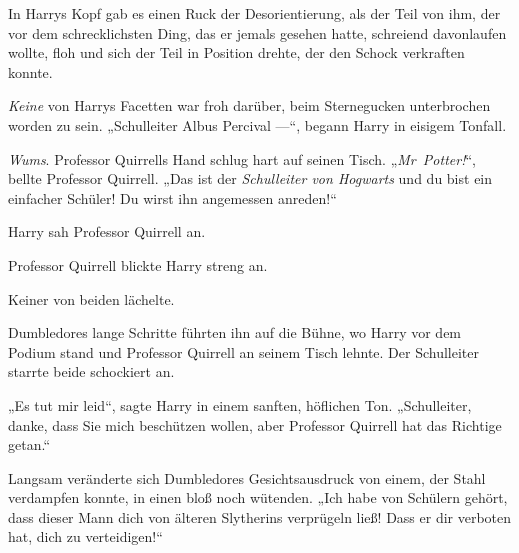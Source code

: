 In Harrys Kopf gab es einen Ruck der Desorientierung, als der Teil von ihm, der vor dem schrecklichsten Ding, das er jemals gesehen hatte, schreiend davonlaufen wollte, floh und sich der Teil in Position drehte, der den Schock verkraften konnte.

\emph{Keine} von Harrys Facetten war froh darüber, beim Sternegucken unterbrochen worden zu sein.
„Schulleiter Albus Percival —“, begann Harry in eisigem Tonfall.

\emph{Wums}. Professor Quirrells Hand schlug hart auf seinen Tisch.
„\emph{Mr~Potter!}“, bellte Professor Quirrell.
„Das ist der \emph{Schulleiter von Hogwarts} und du bist ein einfacher Schüler! Du wirst ihn angemessen anreden!“

Harry sah Professor Quirrell an.

Professor Quirrell blickte Harry streng an.

Keiner von beiden lächelte.

Dumbledores lange Schritte führten ihn auf die Bühne, wo Harry vor dem Podium stand und Professor Quirrell an seinem Tisch lehnte. Der Schulleiter starrte beide schockiert an.

„Es tut mir leid“, sagte Harry in einem sanften, höflichen Ton.
„Schulleiter, danke, dass Sie mich beschützen wollen, aber Professor Quirrell hat das Richtige getan.“

Langsam veränderte sich Dumbledores Gesichtsausdruck von einem, der Stahl verdampfen konnte, in einen bloß noch wütenden.
„Ich habe von Schülern gehört, dass dieser Mann dich von älteren Slytherins verprügeln ließ! Dass er dir verboten hat, dich zu verteidigen!“

